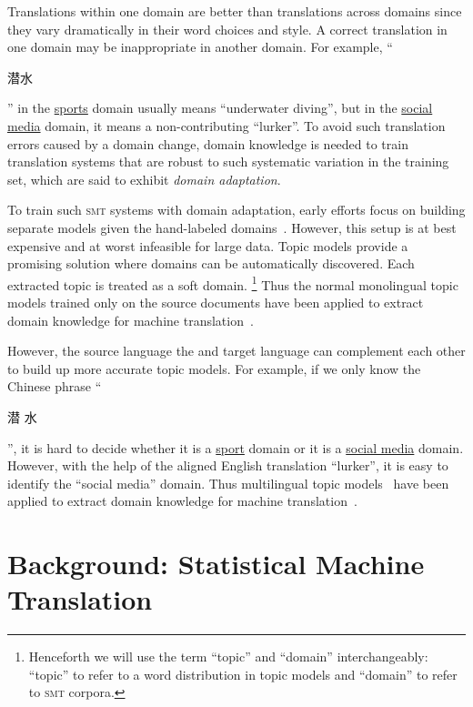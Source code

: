 Translations within one domain are better than translations across
domains since they vary dramatically in their word choices and style.
A correct translation in one domain may be inappropriate in another
domain.  For example, ``\begin{CJK*}{UTF8}{gbsn}潜水\end{CJK*}'' in the
  \underline{sports} domain usually means ``underwater diving'', but
  in the \underline{social media} domain, it means a non-contributing
  ``lurker''. To avoid such translation errors caused by a domain
  change, domain knowledge is needed to train translation systems that
  are robust to such systematic variation in the training set, which
  are said to exhibit \emph{domain adaptation}.

To train such \textsc{smt} systems with domain adaptation, early
efforts focus on building separate models given the hand-labeled
domains~\citep{foster-07,matsoukas-09,chiang-11}. However, this setup
is at best expensive and at worst infeasible for large data.  Topic
models provide a promising solution where domains can be automatically
discovered. Each extracted topic is treated as a soft
domain. \footnote{Henceforth we will use the term ``topic'' and
  ``domain'' interchangeably: ``topic'' to refer to  a word distribution in
  topic models and ``domain'' to refer to \textsc{smt} corpora.} Thus
the normal monolingual topic models trained only on the source documents have
been applied to extract domain knowledge for machine
translation~\citep{Eidelman-12}.

However, the source language the and target language can complement
each other to build up more accurate topic models. For example, if we
only know the Chinese phrase ``\begin{CJK*}{UTF8}{gbsn}潜
  水\end{CJK*}'', it is hard to decide whether it is a
  \underline{sport} domain or it is a \underline{social media}
  domain. However, with the help of the aligned English translation
  ``lurker'', it is easy to identify the ``social media'' domain. Thus
  multilingual topic models~\citep{mimno-09,boyd-graber-10} have been
  applied to extract domain knowledge for machine
  translation~\citep{hu-14}.

\section{Background: Statistical Machine Translation}

